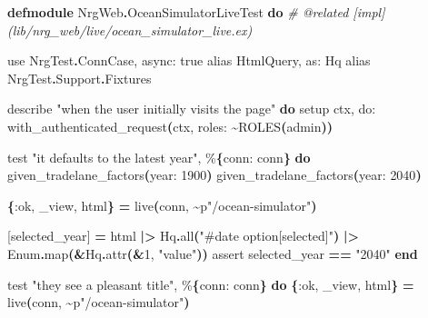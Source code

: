 \documentclass[11pt,a4paper,greek,twoside]{template-xe}
\newenvironment{Shaded}{\begin{english}\begin{snugshade}}{\end{snugshade}\end{english}}
\newcommand{\CommentTok}[1]{\textcolor[rgb]{0.56,0.35,0.01}{\textit{#1}}}
\newcommand{\ConstantTok}[1]{\textcolor[rgb]{0.56,0.35,0.01}{#1}}
\newcommand{\DecValTok}[1]{\textcolor[rgb]{0.00,0.00,0.81}{#1}}
\newcommand{\FunctionTok}[1]{\textcolor[rgb]{0.13,0.29,0.53}{\textbf{#1}}}
\newcommand{\ImportTok}[1]{#1}
\newcommand{\KeywordTok}[1]{\textcolor[rgb]{0.13,0.29,0.53}{\textbf{#1}}}
\newcommand{\NormalTok}[1]{#1}
\newcommand{\OperatorTok}[1]{\textcolor[rgb]{0.81,0.36,0.00}{\textbf{#1}}}
\newcommand{\OtherTok}[1]{\textcolor[rgb]{0.56,0.35,0.01}{#1}}
\newcommand{\StringTok}[1]{\textcolor[rgb]{0.31,0.60,0.02}{#1}}
\newcommand{\VariableTok}[1]{\textcolor[rgb]{0.00,0.00,0.00}{#1}}
\begin{document}
\begin{Shaded}
\begin{Highlighting}[]
\KeywordTok{defmodule} \ConstantTok{NrgWeb}\OperatorTok{.}\ConstantTok{OceanSimulatorLiveTest} \KeywordTok{do}
  \CommentTok{\# @related [impl](lib/nrg\_web/live/ocean\_simulator\_live.ex)}

  \ImportTok{use} \ConstantTok{NrgTest}\OperatorTok{.}\ConstantTok{ConnCase}\NormalTok{, }\VariableTok{async:} \ConstantTok{true}
  \ImportTok{alias} \ConstantTok{HtmlQuery}\NormalTok{, }\VariableTok{as:} \ConstantTok{Hq}
  \ImportTok{alias} \ConstantTok{NrgTest}\OperatorTok{.}\ConstantTok{Support}\OperatorTok{.}\ConstantTok{Fixtures}

\NormalTok{  describe }\StringTok{"when the user initially visits the page"} \KeywordTok{do}
\NormalTok{    setup ctx, }\VariableTok{do:}\NormalTok{ with\_authenticated\_request}\FunctionTok{(}\NormalTok{ctx, }\VariableTok{roles:} \OperatorTok{\textasciitilde{}}\ConstantTok{ROLES}\FunctionTok{(}\NormalTok{admin}\FunctionTok{))}

\NormalTok{    test }\StringTok{"it defaults to the latest year"}\NormalTok{, \%}\FunctionTok{\{}\VariableTok{conn:}\NormalTok{ conn}\FunctionTok{\}} \KeywordTok{do}
\NormalTok{      given\_tradelane\_factors}\FunctionTok{(}\VariableTok{year:} \DecValTok{1900}\FunctionTok{)}
\NormalTok{      given\_tradelane\_factors}\FunctionTok{(}\VariableTok{year:} \DecValTok{2040}\FunctionTok{)}

      \FunctionTok{\{}\VariableTok{:ok}\NormalTok{, \_view, html}\FunctionTok{\}} \OperatorTok{=}\NormalTok{ live}\FunctionTok{(}\NormalTok{conn, }\OperatorTok{\textasciitilde{}}\NormalTok{p}\StringTok{"/ocean{-}simulator"}\FunctionTok{)}

      \OtherTok{[}\NormalTok{selected\_year}\OtherTok{]} \OperatorTok{=}\NormalTok{ html }\OperatorTok{|\textgreater{}} \ConstantTok{Hq}\OperatorTok{.}\NormalTok{all}\FunctionTok{(}\StringTok{"\#date option[selected]"}\FunctionTok{)} \OperatorTok{|\textgreater{}} \ConstantTok{Enum}\OperatorTok{.}\NormalTok{map}\FunctionTok{(}\OperatorTok{\&}\ConstantTok{Hq}\OperatorTok{.}\NormalTok{attr}\FunctionTok{(}\OperatorTok{\&}\DecValTok{1}\NormalTok{, }\StringTok{"value"}\FunctionTok{))}
\NormalTok{      assert selected\_year }\OperatorTok{==} \StringTok{"2040"}
    \KeywordTok{end}

\NormalTok{    test }\StringTok{"they see a pleasant title"}\NormalTok{, \%}\FunctionTok{\{}\VariableTok{conn:}\NormalTok{ conn}\FunctionTok{\}} \KeywordTok{do}
      \FunctionTok{\{}\VariableTok{:ok}\NormalTok{, \_view, html}\FunctionTok{\}} \OperatorTok{=}\NormalTok{ live}\FunctionTok{(}\NormalTok{conn, }\OperatorTok{\textasciitilde{}}\NormalTok{p}\StringTok{"/ocean{-}simulator"}\FunctionTok{)}


\end{Highlighting}
\end{Shaded}
\end{document}
